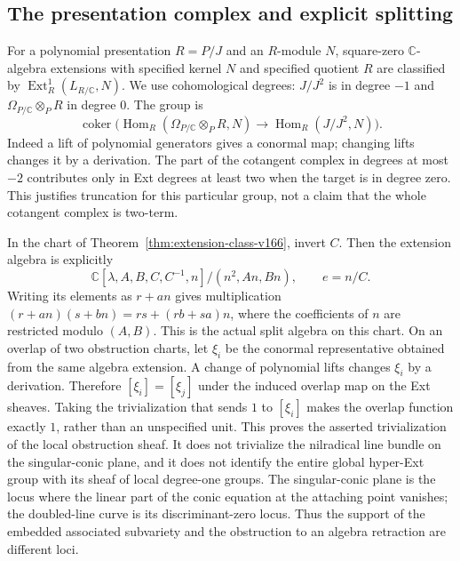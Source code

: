 \documentclass[11pt,reqno]{amsart}
\numberwithin{equation}{section}
\theoremstyle{definition}\newtheorem{definition}[theorem]{Definition}
\theoremstyle{remark}\newtheorem{remark}[theorem]{Remark}
\newcommand{\C}{\mathbb C}\newcommand{\Q}{\mathbb Q}
\DeclareMathOperator{\Hom}{Hom}\DeclareMathOperator{\Tot}{Tot}
\DeclareMathOperator{\coker}{coker}\DeclareMathOperator{\codim}{codim}
\begin{document}
\subsection{The presentation complex and explicit splitting}
For a polynomial presentation $R=P/J$ and an $R$-module $N$,
square-zero $\C$-algebra extensions with specified kernel $N$
and specified quotient $R$ are classified by
$\operatorname{Ext}^1_R(L_{R/\C},N)$. We use cohomological degrees:
$J/J^2$ is in degree $-1$ and
$\Omega_{P/\C}\otimes_PR$ in degree $0$. The group is
\[
 \coker\bigl(\Hom_R(\Omega_{P/\C}\otimes_PR,N)
                       \longrightarrow\Hom_R(J/J^2,N)\bigr).
\]
Indeed a lift of polynomial generators gives a conormal map;
changing lifts changes it by a derivation. The part of the
cotangent complex in degrees at most $-2$ contributes only in
Ext degrees at least two when the target is in degree zero.
This justifies truncation for this particular group, not a claim
that the whole cotangent complex is two-term.

In the chart of Theorem~\ref{thm:extension-class-v166}, invert $C$.
Then the extension algebra is explicitly
\[
 \C[\lambda,A,B,C,C^{-1},n]/(n^2,An,Bn),\qquad e=n/C.
\]
Writing its elements as $r+an$ gives multiplication
$(r+an)(s+bn)=rs+(rb+sa)n$, where the coefficients of $n$ are
restricted modulo $(A,B)$. This is the actual split algebra on
this chart. On an overlap of two obstruction charts, let $\xi_i$
be the conormal representative obtained from the same algebra
extension. A change of polynomial lifts changes $\xi_i$ by a
derivation. Therefore $[\xi_i]=[\xi_j]$ under the induced overlap
map on the Ext sheaves. Taking the trivialization that sends
$1$ to $[\xi_i]$ makes the overlap function exactly $1$, rather
than an unspecified unit. This proves the asserted trivialization
of the local obstruction sheaf. It does not trivialize the
nilradical line bundle on the singular-conic plane, and it does
not identify the entire global hyper-Ext group with its sheaf of
local degree-one groups. The singular-conic plane is the locus
where the linear part of the conic equation at the attaching
point vanishes; the doubled-line curve is its discriminant-zero
locus. Thus the support of the embedded associated subvariety
and the obstruction to an algebra retraction are different loci.
\end{document}

